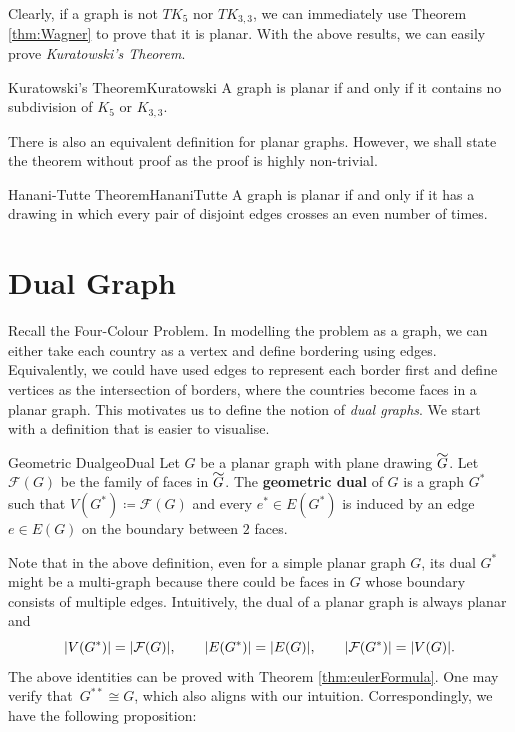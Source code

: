 \documentclass[math]{amznotes}
\renewcommand\widetilde[1]{\ThisStyle{%
  \setbox0=\hbox{$\SavedStyle#1$}%
  \stackengine{1pt-\LMpt}{$\SavedStyle#1$}{%
    \stretchto{\scaleto{\SavedStyle\mkern.2mu\sim}{.5467\wd0}}{.5\ht0}%
  }{O}{c}{F}{T}{S}%
}}
\theoremstyle{remark}
\begin{document}
Clearly, if a graph is not $TK_5$ nor $TK_{3, 3}$, we can immediately use Theorem \ref{thm:Wagner} to prove that it is planar. With the above results, we can easily prove \textit{Kuratowski's Theorem}.
\begin{thmbox}{Kuratowski's Theorem}{Kuratowski}
    A graph is planar if and only if it contains no subdivision of $K_5$ or $K_{3, 3}$.
\end{thmbox}
There is also an equivalent definition for planar graphs. However, we shall state the theorem without proof as the proof is highly non-trivial.
\begin{thmbox}{Hanani-Tutte Theorem}{HananiTutte}
    A graph is planar if and only if it has a drawing in which every pair of disjoint edges crosses an even number of times.
\end{thmbox}
\section{Dual Graph}
Recall the Four-Colour Problem. In modelling the problem as a graph, we can either take each country as a vertex and define bordering using edges. Equivalently, we could have used edges to represent each border first and define vertices as the intersection of borders, where the countries become faces in a planar graph. This motivates us to define the notion of \textit{dual graphs}. We start with a definition that is easier to visualise.
\begin{dfnbox}{Geometric Dual}{geoDual}
    Let $G$ be a planar graph with plane drawing $\widetilde{G}$. Let $\mathcal{F}(G)$ be the family of faces in $\widetilde{G}$. The {\color{red} \textbf{geometric dual}} of $G$ is a graph $G^*$ such that $V(G^*) \coloneqq \mathcal{F}(G)$ and every $e^* \in E(G^*)$ is induced by an edge $e \in E(G)$ on the boundary between $2$ faces.
\end{dfnbox}
Note that in the above definition, even for a simple planar graph $G$, its dual $G^*$ might be a multi-graph because there could be faces in $G$ whose boundary consists of multiple edges. Intuitively, the dual of a planar graph is always planar and 
\begin{equation*}
    {\left\lvert {V(G^*)} \right\rvert} = {\left\lvert {\mathcal{F}(G)} \right\rvert}, \qquad {\left\lvert {E(G^*)} \right\rvert} = {\left\lvert {E(G)} \right\rvert}, \qquad {\left\lvert {\mathcal{F}(G^*)} \right\rvert} = {\left\lvert {V(G)} \right\rvert}.
\end{equation*}
The above identities can be proved with Theorem \ref{thm:eulerFormula}. One may verify that~$G^{**} \cong G$, which also aligns with our intuition. Correspondingly, we have the following proposition:
\end{document}
